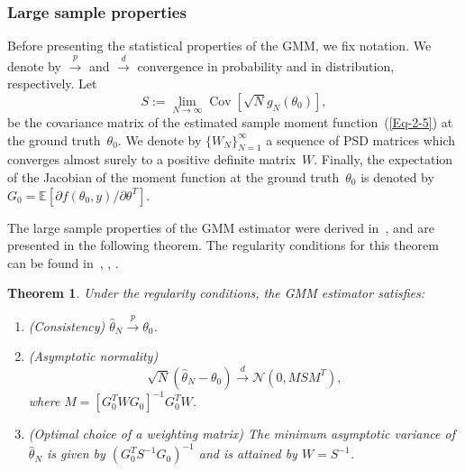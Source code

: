 \documentclass{article}
\newtheorem{theorem}[assumption]{Theorem}%
\newcommand{\E}[0]{\mathbb{E}}
\newcommand{\Cov}[0]{\operatorname{Cov}}
\begin{document}
\subsubsection{Large sample properties}
\label{gmm:large}
Before presenting the statistical properties of the GMM, we fix notation. We denote by $\overset{p}{\to}$ and $\overset{d}{\to}$ convergence in  probability and in distribution, respectively. Let
\begin{equation} \label{eqn:cov_mat_S}
	S := \lim_{N\to \infty}\Cov\left[\sqrt{N}g_N(\theta_0)\right],
\end{equation}
be the covariance matrix of the estimated sample moment function~(\ref{Eq-2-5}) at the ground truth~$\theta_0$. We denote by $\{W_N\}_{N=1}^\infty$ a sequence of PSD matrices which converges almost surely to a positive definite matrix~$W$. Finally, the expectation of the Jacobian of the moment function at the ground truth~$\theta_0$ is denoted by $G_0 = \E\left[\partial f(\theta_0, y) / \partial \theta^T\right]$.

The large sample properties of the GMM estimator were derived in~\cite{Hansen1982}, and are presented in the following theorem. The regularity conditions for this theorem can be found in~\cite{Hansen1982}, \cite{Hall2005}, \cite{abas2021generalized}.

\begin{theorem}\label{Thm-2-6}
	Under {the} regularity conditions, the GMM estimator satisfies:
	\begin{enumerate}[label={\Alph*}.]
		\item  \label{Thm-2-2}
		\textnormal{(Consistency)} $\hat{\theta}_N \overset{p}{\to} \theta_0$.

		\item \label{Thm-2-3} \textnormal{(Asymptotic normality)}
		\[\sqrt{N} ( \hat{\theta}_N - \theta_0) \overset{d}{\to} \mathcal{N}(0, M S M^T ),\] where $M =[G_0^T W  G_0]^{-1} G_0^T  W$.

		\item \label{Thm-2-5} \textnormal{(Optimal choice of a weighting matrix)} The minimum asymptotic variance of $\hat{\theta}_N$ is given by $(G_0^T S^{-1} G_0)^{-1}$ and is attained by $W = S^{-1}$.
	\end{enumerate}
\end{theorem}
\end{document}
